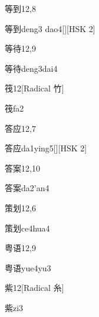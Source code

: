 \begin{entry}{等到}{12,8}
  \begin{phonetics}{等到}{deng3 dao4}[][HSK 2]
  \end{phonetics}
\end{entry}

\begin{entry}{等待}{12,9}
  \begin{phonetics}{等待}{deng3dai4}
  \end{phonetics}
\end{entry}

\begin{entry}{筏}{12}[Radical 竹]
  \begin{phonetics}{筏}{fa2}
  \end{phonetics}
\end{entry}

\begin{entry}{答应}{12,7}
  \begin{phonetics}{答应}{da1ying5}[][HSK 2]
  \end{phonetics}
\end{entry}

\begin{entry}{答案}{12,10}
  \begin{phonetics}{答案}{da2'an4}
  \end{phonetics}
\end{entry}

\begin{entry}{策划}{12,6}
  \begin{phonetics}{策划}{ce4hua4}
  \end{phonetics}
\end{entry}

\begin{entry}{粤语}{12,9}
  \begin{phonetics}{粤语}{yue4yu3}
  \end{phonetics}
\end{entry}

\begin{entry}{紫}{12}[Radical 糸]
  \begin{phonetics}{紫}{zi3}
  \end{phonetics}
\end{entry}

